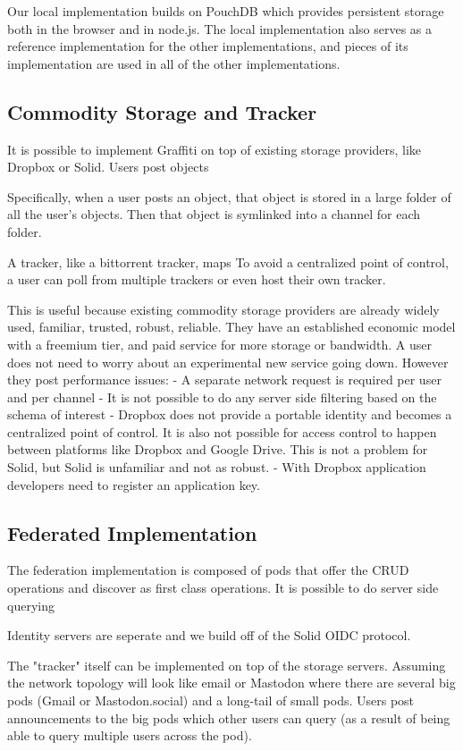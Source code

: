 Our local implementation builds on PouchDB which provides persistent
storage both in the browser and in node.js.
The local implementation also serves as a reference implementation for the other implementations,
and pieces of its implementation are used in all of the other implementations.

\subsection{Commodity Storage and Tracker}

It is possible to implement Graffiti on top of existing storage providers,
like Dropbox or Solid. Users post objects

Specifically, when a user posts an object, that object is stored in
a large folder of all the user's objects. Then that object is symlinked into
a channel for each folder.

A tracker, like a bittorrent tracker, maps
To avoid a centralized point of control, a user can poll from multiple trackers or
even host their own tracker.

This is useful because existing commodity storage providers are
already widely used, familiar, trusted, robust, reliable.
They have an established economic model with a freemium tier, and paid
service for more storage or bandwidth.
A user does not need to worry about an experimental new service going down.
However they post performance issues:
- A separate network request is required per user and per channel
- It is not possible to do any server side filtering based on the schema of interest
- Dropbox does not provide a portable identity and becomes a centralized point of control.
It is also not possible for access control to happen between platforms like Dropbox and Google Drive.
This is not a problem for Solid, but Solid is unfamiliar and not as robust.
- With Dropbox application developers need to register an application key.

\subsection{Federated Implementation}

The federation implementation is composed of pods that offer
the CRUD operations and discover as first class operations.
It is possible to do server side querying

Identity servers are seperate and we build off of the Solid OIDC protocol.

The "tracker" itself can be implemented on top of the storage servers.
Assuming the network topology will look like email or Mastodon where there are several
big pods (Gmail or Mastodon.social) and a long-tail of small pods.
Users post announcements to the big pods which other users can query
(as a result of being able to query multiple users across the pod).

